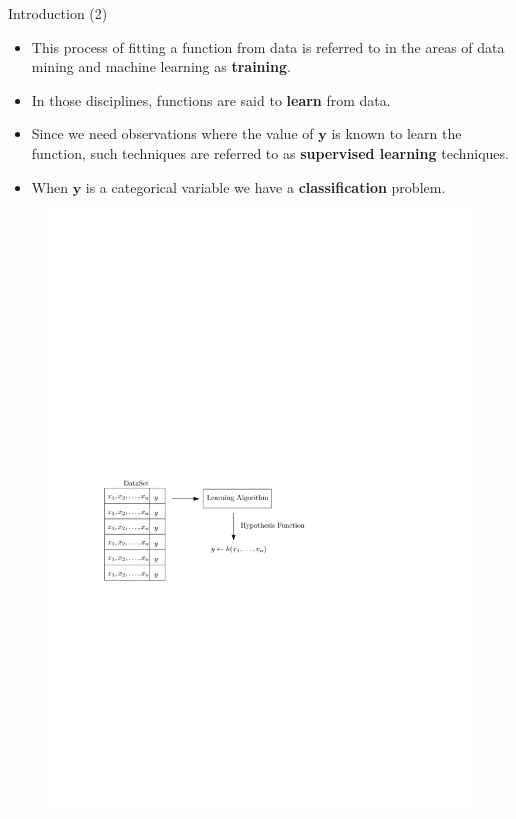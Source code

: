 \documentclass[handout]{beamer}
\begin{document}
\begin{frame}{Introduction (2)}
\scriptsize{
\begin{itemize}
 
 \item This process of fitting a function from data is referred to in the areas of data mining and machine learning as \textbf{training}.

 \item In those disciplines, functions are said to \textbf{learn} from data.
 
 \item Since we need observations where the value of $\mathbf{y}$ is known to learn the function, such techniques are referred to as \textbf{supervised learning} techniques.
 
 \item When $\mathbf{y}$ is a categorical variable we have a \textbf{classification} problem.
 

 
\end{itemize}


\begin{figure}[h!]
	\centering
	\includegraphics[scale=0.6]{pics/learning.pdf}
\end{figure}

} 
 
\end{frame}
\end{document}
